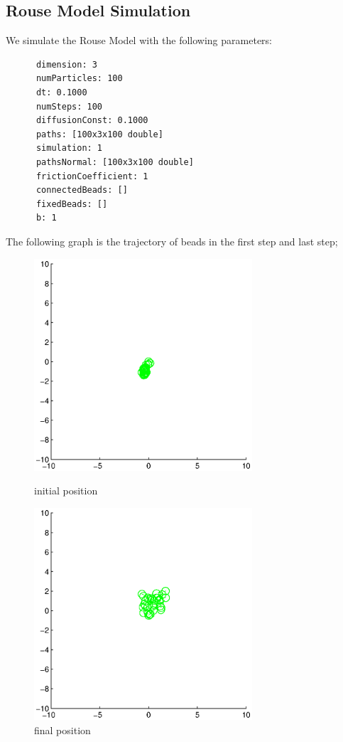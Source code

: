 \documentclass{article}
\begin{document}
	 \subsection{Rouse Model Simulation}
	 We simulate the Rouse Model with the following parameters:
	 \begin{lstlisting}
	  dimension: 3
	  numParticles: 100
	  dt: 0.1000
	  numSteps: 100
	  diffusionConst: 0.1000
	  paths: [100x3x100 double]
	  simulation: 1
	  pathsNormal: [100x3x100 double]
	  frictionCoefficient: 1
	  connectedBeads: []
	  fixedBeads: []
	  b: 1
	 \end{lstlisting}
	 The following graph is the trajectory of beads in the first step and last step;
	 \begin{figure}[H]
	 	\begin{minipage}[t]{0.5\textwidth}
	 		\centering
	 		\includegraphics[width=3.2in]{rouseM.eps}
	 		\caption{initial position}
	 	\end{minipage}%
	 	\begin{minipage}[t]{0.5\textwidth}
	 		\centering
	 		\includegraphics[width=3.2in]{rouseMF.eps}
	 		\caption{final position}
	 		
	 	\end{minipage}
	 \end{figure}
\end{document}
